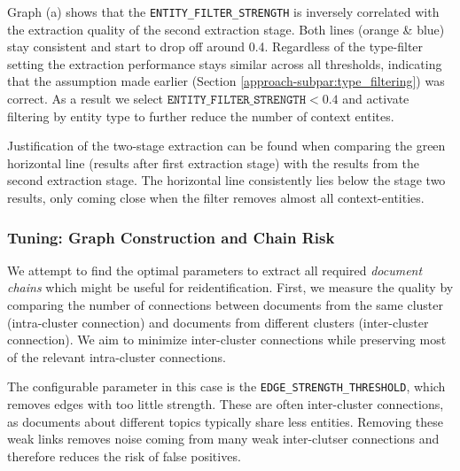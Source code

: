 Graph (a) shows that the \texttt{ENTITY\_FILTER\_STRENGTH} is inversely correlated with the extraction quality of the second extraction stage. Both lines (orange \& blue) stay consistent and start to drop off around 0.4. Regardless of the type-filter setting the extraction performance stays similar across all thresholds, indicating that the assumption made earlier (Section \ref{approach-subpar:type_filtering}) was correct. As a result we select $\texttt{ENTITY\_FILTER\_STRENGTH} < 0.4$ and activate filtering by entity type to further reduce the number of context entites.

Justification of the two-stage extraction can be found when comparing the green horizontal line (results after first extraction stage) with the results from the second extraction stage. The horizontal line consistently lies below the stage two results, only coming close when the filter removes almost all context-entities. 

\subsubsection{Tuning: Graph Construction and Chain Risk}
We attempt to find the optimal parameters to extract all required \textit{document chains} which might be useful for reidentification. First, we measure the quality by comparing the number of connections between documents from the same cluster (intra-cluster connection) and documents from different clusters (inter-cluster connection). We aim to minimize inter-cluster connections while preserving most of the relevant intra-cluster connections.

The configurable parameter in this case is the \texttt{EDGE\_STRENGTH\_THRESHOLD}, which removes edges with too little strength. These are often inter-cluster connections, as documents about different topics typically share less entities. Removing these weak links 
removes noise coming from many weak inter-clutser connections and therefore reduces the risk of false positives.

